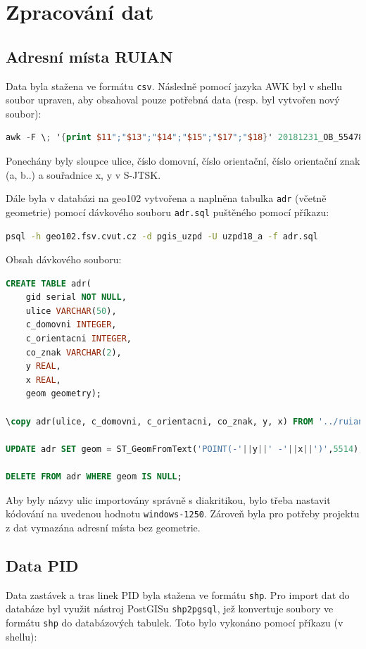 \documentclass[a4paper, 12pt]{article}
\begin{document}
\newpage
\section{Zpracování dat}
\subsection{Adresní místa RUIAN}
Data byla stažena ve formátu \texttt{csv}. Následně pomocí jazyka AWK byl v shellu soubor upraven, aby obsahoval pouze potřebná data (resp. byl vytvořen nový soubor):
\begin{lstlisting}[language=awk]
awk -F \; '{print $11";"$13";"$14";"$15";"$17";"$18}' 20181231_OB_554782_ADR.csv > ruian_adr.csv
\end{lstlisting}

Ponechány byly sloupce ulice, číslo domovní, číslo orientační, číslo orientační znak (a, b..) a souřadnice x, y v S-JTSK. 

Dále byla v databázi na geo102 vytvořena a naplněna tabulka \texttt{adr} (včetně geometrie) pomocí dávkového souboru \texttt{adr.sql} puštěného pomocí příkazu:

\begin{lstlisting}[language=bash]
psql -h geo102.fsv.cvut.cz -d pgis_uzpd -U uzpd18_a -f adr.sql	
\end{lstlisting}

Obsah dávkového souboru:

\begin{lstlisting}[language=sql]
CREATE TABLE adr(
	gid serial NOT NULL,
	ulice VARCHAR(50),
	c_domovni INTEGER,
	c_orientacni INTEGER,
	co_znak VARCHAR(2),
	y REAL,
	x REAL,
	geom geometry);
	
\copy adr(ulice, c_domovni, c_orientacni, co_znak, y, x) FROM '../ruian_adr.csv' DELIMITER ';' CSV HEADER encoding 'windows-1250';

UPDATE adr SET geom = ST_GeomFromText('POINT(-'||y||' -'||x||')',5514);

DELETE FROM adr WHERE geom IS NULL;

\end{lstlisting}

Aby byly názvy ulic importovány správně s diakritikou, bylo třeba nastavit kódování na uvedenou hodnotu \texttt{windows-1250}. Zároveň byla pro potřeby projektu z dat vymazána adresní místa bez geometrie.

\subsection{Data PID}
Data zastávek a tras linek PID byla stažena ve formátu \texttt{shp}. Pro import dat do databáze byl využit nástroj PostGISu \texttt{shp2pgsql}, jež konvertuje soubory ve formátu \texttt{shp} do databázových tabulek. Toto bylo vykonáno pomocí příkazu (v shellu):
\end{document}
